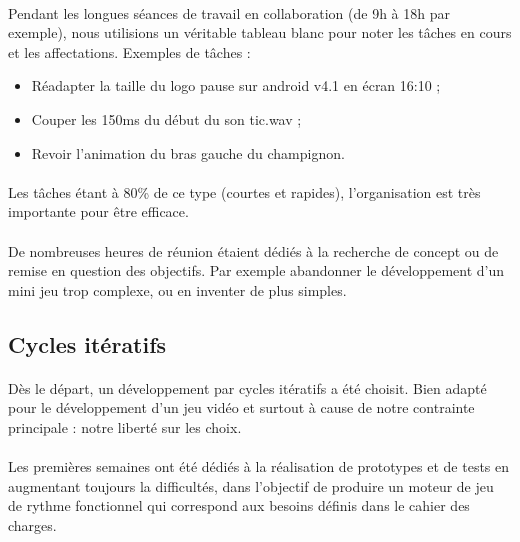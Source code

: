 \paragraph{}
Pendant les longues séances de travail en collaboration (de 9h à 18h par exemple), nous utilisions un véritable tableau blanc pour noter les tâches en cours et les affectations. Exemples de tâches :

\begin{itemize}
\item Réadapter la taille du logo pause sur android v4.1 en écran 16:10 ;
\item Couper les 150ms du début du son tic.wav ;
\item Revoir l’animation du bras gauche du champignon.
\end{itemize}

\paragraph{}
Les tâches étant à 80\% de ce type (courtes et rapides), l’organisation est très importante pour être efficace.

\paragraph{}
De nombreuses heures de réunion étaient dédiés à la recherche de concept ou de remise en question des objectifs. Par exemple abandonner le développement d’un mini jeu trop complexe, ou en inventer de plus simples.

\subsection{Cycles itératifs}

\paragraph{}
Dès le départ, un développement par cycles itératifs a été choisit. Bien adapté pour le développement d’un jeu vidéo et surtout à cause de notre contrainte principale : notre liberté sur les choix.

\paragraph{}
Les premières semaines ont été dédiés à la réalisation de prototypes et de tests en augmentant toujours la difficultés, dans l’objectif de produire un moteur de jeu de rythme fonctionnel qui correspond aux besoins définis dans le cahier des charges.

